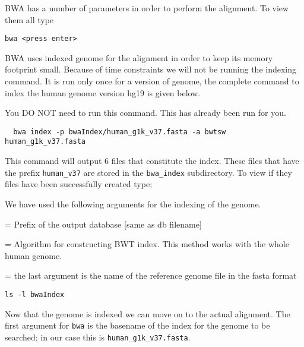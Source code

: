 \begin{steps}
BWA has a number of parameters in order to perform the alignment. To view them all type

\begin{lstlisting}
bwa <press enter> 
\end{lstlisting}

BWA uses indexed genome for the alignment in order to keep its memory footprint small. Because of time constraints we will not be running the indexing command. It is run only once for a version of genome, the complete command to index the human genome version hg19 is given below. 

\begin{warning}
  You DO NOT need to run this command. This has already been run for you.
  \begin{lstlisting}
  bwa index -p bwaIndex/human_g1k_v37.fasta -a bwtsw human_g1k_v37.fasta
  \end{lstlisting}
\end{warning}

This command will output 6 files that constitute the index. These files that have the prefix \texttt{human\_v37} are stored in the \texttt{bwa\_index} subdirectory. To view if they files have been successfully created type:

We have used the following arguments for the indexing of the genome.
\begin{description}[style=multiline,labelindent=0cm,align=right,leftmargin=\descriptionlabelspace,rightmargin=1.5cm,font=\ttfamily]
  \item[-p] = Prefix of the output database [same as db filename]
  \item[-a] = Algorithm for constructing BWT index. This method works with the whole human genome.
  \item[ref genome filename] = the last argument is the name of the reference genome file in the fasta format
\end{description}

\begin{lstlisting}
ls -l bwaIndex
\end{lstlisting}
\end{steps}

\begin{information}
Now that the genome is indexed we can move on to the actual alignment. The first
argument for \texttt{bwa} is the basename of the index for the genome to be searched;
in our case this is \texttt{human\_g1k\_v37.fasta}.

\end{information}

